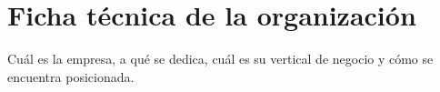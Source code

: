 \section{Ficha técnica de la organización}
\label{section:ficha}

Cuál es la empresa, a qué se dedica, cuál es su vertical de negocio y cómo se encuentra posicionada.

